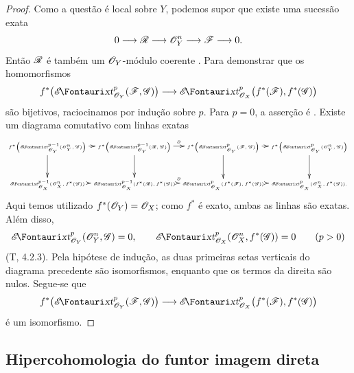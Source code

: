 \begin{proof}
Como a questão é local sobre $Y$, podemos supor que existe uma
sucessão exata
\[
  0\longrightarrow\mathscr{R}\longrightarrow\mathscr{O}_Y^n
  \longrightarrow\mathscr{F}\longrightarrow0.
\]
Então $\mathscr{R}$ é também um $\mathscr{O}_Y$-módulo coerente
.
Para demonstrar que os homomorfismos
\[
  f^*\bigl(\shExt^p_{\sh{O}_Y}(\sh{F},\sh{G})\bigr)
  \longrightarrow
  \shExt^p_{\sh{O}_X}
    \bigl(f^*(\sh{F}),f^*(\sh{G})\bigr)
\]
são bijetivos, raciocinamos por indução sobre $p$.
Para $p=0$, a asserção é
.
Existe um diagrama comutativo com linhas exatas
\[
{\tiny
  \xymatrix@C=2pt@R=24pt{
  f^*\!\left(\shExt^{p-1}_{\sh{O}_Y}(\sh{O}_Y^n,\sh{G})\right)
    \ar[r]\ar[d]
  & f^*\!\left(\shExt^{p-1}_{\sh{O}_Y}(\sh{R},\sh{G})\right)
    \ar[r]^\partial\ar[d]
  & f^*\!\left(\shExt^p_{\sh{O}_Y}(\sh{F},\sh{G})\right)
    \ar[r]\ar[d]
  & f^*\!\left(\shExt^p_{\sh{O}_Y}(\sh{O}_Y^n,\sh{G})\right)
    \ar[d]\\
  \shExt^{p-1}_{\sh{O}_X}(\sh{O}_X^n,f^*(\sh{G}))
    \ar[r]
  & \shExt^{p-1}_{\sh{O}_X}(f^*(\sh{R}),f^*(\sh{G}))
    \ar[r]^\partial
  & \shExt^p_{\sh{O}_X}(f^*(\sh{F}),f^*(\sh{G}))
    \ar[r]
  & \shExt^p_{\sh{O}_X}(\sh{O}_X^n,f^*(\sh{G})).
  }}
\]
Aqui temos utilizado $f^*(\mathscr{O}_Y)=\mathscr{O}_X$; como $f^*$ é exato,
ambas as linhas são exatas.
Além disso,
\[
  \shExt^p_{\sh{O}_Y}(\sh{O}_Y^n,\sh{G})=0,
  \qquad
  \shExt^p_{\sh{O}_X}(\sh{O}_X^n,f^*(\sh{G}))=0
  \qquad(p>0)
\]
(T, 4.2.3).
Pela hipótese de indução, as duas primeiras setas verticais do
diagrama precedente são isomorfismos, enquanto que os termos da
direita são nulos.  Segue-se que
\[
  f^*\bigl(\shExt^p_{\sh{O}_Y}(\sh{F},\sh{G})\bigr)
  \longrightarrow
  \shExt^p_{\sh{O}_X}
    \bigl(f^*(\sh{F}),f^*(\sh{G})\bigr)
\]
é um isomorfismo.
\end{proof}

\subsection{Hipercohomologia do funtor imagem direta}
\label{subsection:0.12.4}

